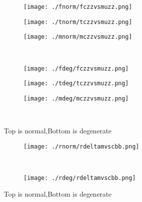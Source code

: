 \documentclass[aps,floats,floatfix,nofootinbib]{revtex4-1}
\begin{document}
\begin{center}
\begin{figure}
\begin{subfigure}{0.3\textwidth}
\texttt{[image: ./fnorm/fczzvsmuzz.png]}
\label{}
\end{subfigure}
\begin{subfigure}{0.3\textwidth}
\texttt{[image: ./tnorm/tczzvsmuzz.png]}
\label{}
\end{subfigure}
\begin{subfigure}{0.3\textwidth}
\texttt{[image: ./mnorm/mczzvsmuzz.png]}
\label{}
\end{subfigure}\\
\begin{subfigure}{0.3\textwidth}
\texttt{[image: ./fdeg/fczzvsmuzz.png]}
\label{}
\end{subfigure}
\begin{subfigure}{0.3\textwidth}
\texttt{[image: ./tdeg/tczzvsmuzz.png]}
\label{}
\end{subfigure}
\begin{subfigure}{0.3\textwidth}
\texttt{[image: ./mdeg/mczzvsmuzz.png]}
\label{}
\end{subfigure}\\
\caption{Top is normal,Bottom is degenerate}
\end{figure}
\end{center}

\begin{center}
\begin{figure}
\begin{subfigure}{0.95\textwidth}
\texttt{[image: ./rnorm/rdeltamvscbb.png]}
\label{}
\end{subfigure}\\
\begin{subfigure}{0.95\textwidth}
\texttt{[image: ./rdeg/rdeltamvscbb.png]}
\label{}
\end{subfigure}
\caption{Top is normal,Bottom is degenerate}
\end{figure}
\end{center}
\end{document}
